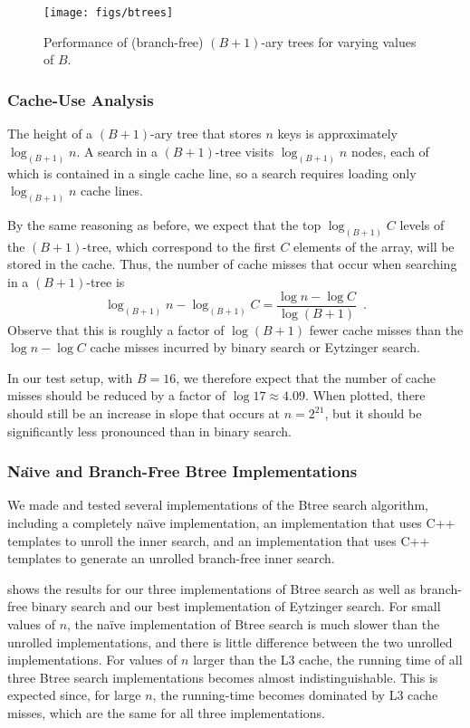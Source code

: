 \documentclass{patmorin}
\begin{document}
\begin{figure}
   \begin{center}
      \texttt{[image: figs/btrees]}
   \end{center} 
   \caption{Performance of (branch-free) $(B+1)$-ary trees for varying values
      of $B$.}
\end{figure}

\subsubsection{Cache-Use Analysis}

The height of a $(B+1)$-ary tree that stores $n$ keys is approximately
$\log_{(B+1)} n$.  A search in a $(B+1)$-tree visits $\log_{(B+1)} n$
nodes, each of which is contained in a single cache line, so a search
requires loading only $\log_{(B+1)} n$ cache lines.

By the same reasoning as before, we expect that the top $\log_{(B+1)} C$
levels of the $(B+1)$-tree, which correspond to the first $C$ elements
of the array, will be stored in the cache.  Thus, the number of cache
misses that occur when searching in a $(B+1)$-tree is
\[
    \log_{(B+1)}n - \log_{(B+1)} C 
         = \frac{\log n - \log C}{\log (B+1)} \enspace .
\]
Observe that this is roughly a factor of $\log(B+1)$ fewer cache misses
than the $\log n-\log C$ cache misses incurred by binary search or
Eytzinger search.

In our test setup, with $B=16$, we therefore expect that the number
of cache misses should be reduced by a factor of $\log 17\approx
4.09$. When plotted, there should still be an increase in slope that
occurs at $n=2^{21}$, but it should be significantly less pronounced
than in binary search.

\subsubsection{Na\"{\i}ve and Branch-Free Btree Implementations}

We made and tested several implementations of the Btree search algorithm,
including a completely na\"{\i}ve implementation, an implementation that
uses C++ templates to unroll the inner search, and an implementation
that uses C++ templates to generate an unrolled branch-free inner search.

 shows the results for our three implementations of
Btree search as well as branch-free binary search and our best implementation
of Eytzinger search.  For small values of $n$, the na\"ive implementation
of Btree search is much slower than the unrolled implementations, and there
is little difference between the two unrolled implementations. For values
of $n$ larger than the L3 cache, the running time of all three Btree
search implementations becomes almost indistinguishable. This is expected
since, for large $n$, the running-time becomes dominated by L3 cache
misses, which are the same for all three implementations.
\end{document}
